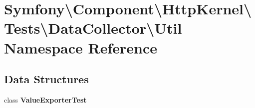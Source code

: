 \section{Symfony\textbackslash{}Component\textbackslash{}Http\+Kernel\textbackslash{}Tests\textbackslash{}Data\+Collector\textbackslash{}Util Namespace Reference}
\label{namespace_symfony_1_1_component_1_1_http_kernel_1_1_tests_1_1_data_collector_1_1_util}
\subsection*{Data Structures}
\begin{DoxyCompactItemize}
\item 
class {\bf Value\+Exporter\+Test}
\end{DoxyCompactItemize}
